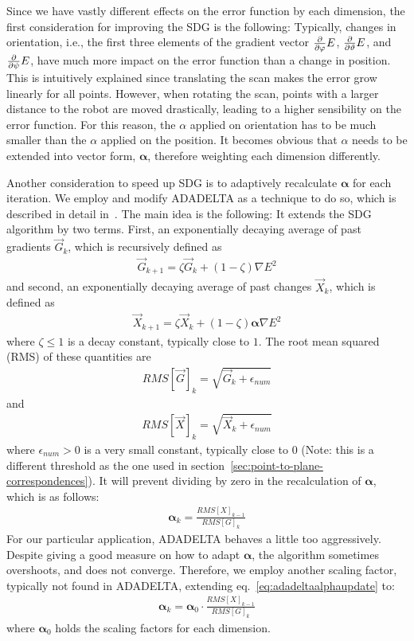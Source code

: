 Since we have vastly different effects on the error function by each dimension, the first consideration for improving the SDG is the following:
Typically, changes in orientation, i.e., the first three elements of the gradient vector $\frac{\partial}{\partial \varphi}E$, $\frac{\partial}{\partial \vartheta}E$, and $\frac{\partial}{\partial \psi}E$, have much more impact on the error function than a change in position.
This is intuitively explained since translating the scan makes the error grow linearly for all points.
However, when rotating the scan, points with a larger distance to the robot are moved drastically, leading to a higher sensibility on the error function.
For this reason, the $\alpha$ applied on orientation has to be much smaller than the $\alpha$ applied on the position.
It becomes obvious that $\alpha$ needs to be extended into vector form, $\boldsymbol\alpha$, therefore weighting each dimension differently.

Another consideration to speed up SDG is to adaptively recalculate $\boldsymbol\alpha$ for each iteration. 
We employ and modify ADADELTA as a technique to do so, which is described in detail in~\cite{zeiler2012adadelta}.
The main idea is the following:
It extends the SDG algorithm by two terms.
First, an exponentially decaying average of past gradients $\vec{G}_k$, which is recursively defined as
\begin{align}
    \vec{G}_{k+1} = \zeta \vec{G}_{k} + (1 - \zeta) {\nabla E}^2
\end{align}
and second, an exponentially decaying average of past changes $\vec{X}_k$, which is defined as
\begin{align}
    \vec{X}_{k+1} = \zeta \vec{X}_{k} + (1 - \zeta) {\boldsymbol\alpha \nabla E}^2
\end{align}
where $\zeta \leq 1$ is a decay constant, typically close to $1$.
The root mean squared (RMS) of these quantities are
\begin{align}
    RMS[\vec{G}]_{k} = \sqrt{\vec{G}_{k} + \epsilon_{num}}
\end{align}
and 
\begin{align}
    RMS[\vec{X}]_{k} = \sqrt{\vec{X}_{k} + \epsilon_{num}}
\end{align}
where $\epsilon_{num} > 0$ is a very small constant, typically close to $0$ (Note: this is a different threshold as the one used in section~\ref{sec:point-to-plane-correspondences}).
It will prevent dividing by zero in the recalculation of $\boldsymbol\alpha$, which is as follows:
\begin{align}
    \boldsymbol\alpha_{k} = \frac{RMS[X]_{k-1}}{RMS[G]_{k}}
    \label{eq:adadeltaalphaupdate}
\end{align} 
For our particular application, ADADELTA behaves a little too aggressively.
Despite giving a good measure on how to adapt $\boldsymbol\alpha$, the algorithm sometimes overshoots, and does not converge.
Therefore, we employ another scaling factor, typically not found in ADADELTA, extending eq.~\eqref{eq:adadeltaalphaupdate} to:
\begin{align}
    \boldsymbol\alpha_{k} = \boldsymbol\alpha_0 \cdot \frac{RMS[X]_{k-1}}{RMS[G]_{k}}
    \label{eq:adafinalized}
\end{align} 
where $\boldsymbol\alpha_0 $ holds the scaling factors for each dimension.

